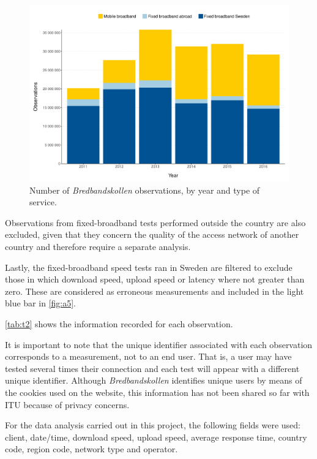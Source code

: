 \documentclass[12pt]{article}
\begin{document}
\begin{figure}[H]
    \centering
        \includegraphics[width=\linewidth]{Observations_year.pdf}
        \caption{Number of \textit{Bredbandskollen} observations, by year and type of service.}
        \label{fig:a5}
\end{figure}   

Observations from fixed-broadband tests performed outside the country are also excluded, given that they concern the quality of the access network of another country and therefore require a separate analysis. 

Lastly, the fixed-broadband speed tests ran in Sweden are filtered to exclude those in which download speed, upload speed or latency where not greater than zero. These are considered as erroneous measurements and included in the light blue bar in \autoref{fig:a5}.           

\autoref{tab:t2} shows the information recorded for each observation. 
 
It is important to note that the unique identifier associated with each observation corresponds to a measurement, not to an end user. That is, a user may have tested several times their connection and each test will appear with a different unique identifier. Although \textit{Bredbandskollen} identifies unique users by means of the cookies used on the website, this information has not been shared so far with ITU because of privacy concerns.

For the data analysis carried out in this project, the following fields were used: client, date/time, download speed, upload speed, average response time, country code, region code, network type and operator.
\end{document}
